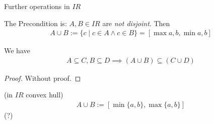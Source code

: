 Further operations in $IR$ \\
\begin{*definition}
	The Precondition is: $A,B\in IR$ are \emph{not disjoint}. Then
	\begin{align*}
		A\cup B:=\{c \mid c\in A \land c\in B\}=[\max{a,b},\min{a,b}]
	\end{align*}
\end{*definition}
\begin{proposition}
	We have 
	\begin{align*}
		A\subseteq C, B\subseteq D \implies (A\cup B)\subseteq(C\cup D)
	\end{align*}
\end{proposition}
\begin{proof}
	Without proof.
\end{proof}
\begin{definition}
	(in $IR$ convex hull)
	\begin{align*}
		A\cup B:=[\min\{a,b\},\max\{a,b\}]
	\end{align*}
	(?) 
\end{definition}

